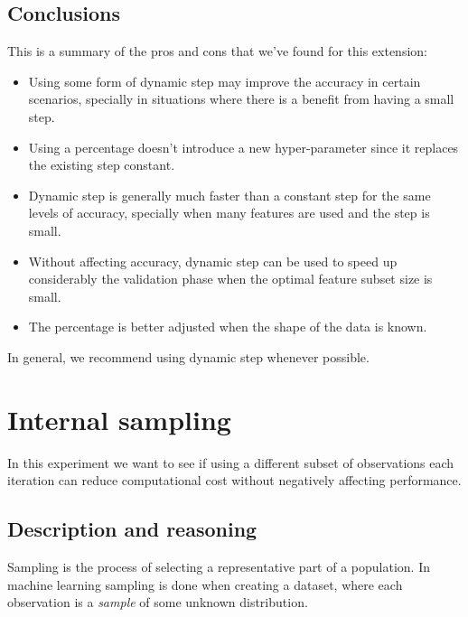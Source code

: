 \subsection{Conclusions}

This is a summary of the pros and cons that we've found for this extension:

\begin{itemize}
    \item Using some form of dynamic step may improve the accuracy in certain sce\-nar\-ios, specially in situations where there is a benefit from having a small step.
    \item Using a percentage doesn't introduce a new hyper-parameter since it replaces the existing step constant.
    \item Dynamic step is generally much faster than a constant step for the same levels of accuracy, specially when many features are used and the step is small.
    \item Without affecting accuracy, dynamic step can be used to speed up considerably the validation phase when the optimal feature subset size is small.
    \item The percentage is better adjusted when the shape of the data is known.
\end{itemize}

In general, we recommend using dynamic step whenever possible.


\section{Internal sampling}

In this experiment we want to see if using a different subset of observations each iteration can reduce computational cost without negatively affecting performance.

\subsection{Description and reasoning}
\label{sec:ch5.sampling.desc}

Sampling is the process of selecting a representative part of a population. In machine learning sampling is done when creating a dataset, where each observation is a \emph{sample} of some unknown distribution. 

